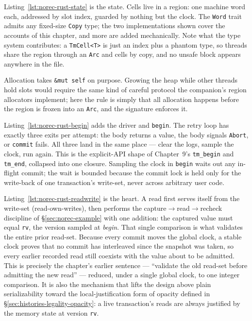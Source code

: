 Listing~\ref{lst:norec-rust-state} is the state. Cells live in a region:
one machine word each, addressed by slot index, guarded by nothing but the
clock. The \texttt{Word} trait admits any fixed-size \texttt{Copy} type;
the two implementations shown cover the accounts of this chapter, and more
are added mechanically. Note what the type system contributes: a
\texttt{TmCell<T>} is just an index plus a phantom type, so threads share
the region through an \texttt{Arc} and cells by copy, and no unsafe block
appears anywhere in the file.



Allocation takes \texttt{\&mut self} on purpose. Growing the heap while
other threads hold slots would require the same kind of careful protocol
the companion's region allocators implement; here the rule is simply that
all allocation happens before the region is frozen into an \texttt{Arc},
and the signature enforces it.

Listing~\ref{lst:norec-rust-begin} adds the driver and \texttt{begin}.
The retry loop has exactly three exits per attempt: the body returns a
value, the body signals \texttt{Abort}, or \texttt{commit} fails. All
three land in the same place --- clear the logs, sample the clock, run
again. This is the explicit-API shape of Chapter~9's \texttt{tm\_begin}
and \texttt{tm\_end}, collapsed into one closure. Sampling the clock in
\texttt{begin} waits out any in-flight commit; the wait is bounded because
the commit lock is held only for the write-back of one transaction's
write-set, never across arbitrary user code.



Listing~\ref{lst:norec-rust-readwrite} is the heart. A read first serves
itself from the write-set (read-own-writes), then performs the
capture$\rightarrow$read$\rightarrow$recheck discipline of
\S\ref{sec:norec-example} with one addition: the captured value must equal
\texttt{rv}, the version sampled at \emph{begin}. That single comparison
is what validates the entire prior read-set. Because every commit moves
the global clock, a stable clock proves that no commit has interleaved
since the snapshot was taken, so every earlier recorded read still
coexists with the value about to be admitted. This is precisely the
chapter's earlier sentence --- ``validate the old read-set before
admitting the new read'' --- reduced, under a single global clock, to one
integer comparison. It is also the mechanism that lifts the design above
plain serializability toward the local-justification form of opacity
defined in \S\ref{sec:histories-legality-opacity}: a live transaction's
reads are always justified by the memory state at version \texttt{rv}.

